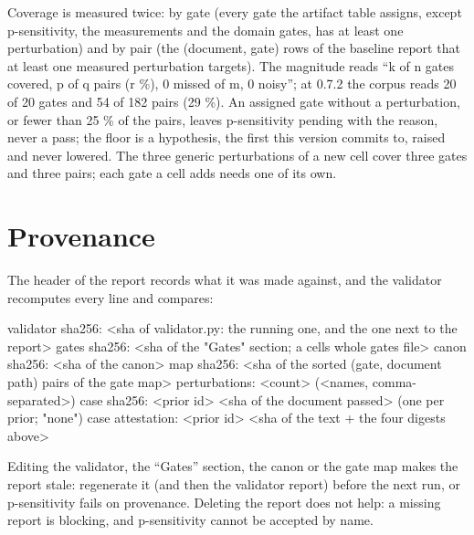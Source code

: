 \documentclass[
  american,
  10pt,
]{report}
\newenvironment{Shaded}{\begin{snugshade}}{\end{snugshade}}
\newcommand{\NormalTok}[1]{#1}
\newcounter{none} %
\renewenvironment{Shaded}{%
  \def\FrameCommand{{\color{rulecolor}\vrule width 2pt}\hspace{6pt}\colorbox{shadecolor}}%
  \MakeFramed{\advance\hsize-\width\FrameRestore}\small}%
  {\endMakeFramed}
\renewcommand{\texttt}[1]{{\ttfamily\hyphenchar\font=-1 #1}}
\begin{document}
Coverage is measured twice: by gate (every gate the artifact table
assigns, except \texttt{p-\allowbreak{}sensitivity}, the measurements
and the domain gates, has at least one perturbation) and by pair (the
(document, gate) rows of the baseline report that at least one measured
perturbation targets). The magnitude reads ``k of n gates covered, p of
q pairs (r \%), 0 missed of m, 0 noisy''; at 0.7.2 the corpus reads 20
of 20 gates and 54 of 182 pairs (29 \%). An assigned gate without a
perturbation, or fewer than 25 \% of the pairs, leaves
\texttt{p-\allowbreak{}sensitivity} pending with the reason, never a
pass; the floor is a hypothesis, the first this version commits to,
raised and never lowered. The three generic perturbations of a new cell
cover three gates and three pairs; each gate a cell adds needs one of
its own.

\section{Provenance}\label{provenance}

The header of the report records what it was made against, and the
validator recomputes every line and compares:

\begin{Shaded}
\begin{Highlighting}[]
\NormalTok{validator sha256: \textless{}sha of validator.py: the running one, and the one next to the report\textgreater{}}
\NormalTok{gates sha256: \textless{}sha of the "Gates" section; a cell\textquotesingle{}s whole gates file\textgreater{}}
\NormalTok{canon sha256: \textless{}sha of the canon\textgreater{}}
\NormalTok{map sha256: \textless{}sha of the sorted (gate, document path) pairs of the gate map\textgreater{}}
\NormalTok{perturbations: \textless{}count\textgreater{} (\textless{}names, comma{-}separated\textgreater{})}
\NormalTok{case sha256: \textless{}prior id\textgreater{} \textless{}sha of the document passed\textgreater{}   (one per prior; "none")}
\NormalTok{case attestation: \textless{}prior id\textgreater{} \textless{}sha of the text + the four digests above\textgreater{}}
\end{Highlighting}
\end{Shaded}

Editing the validator, the ``Gates'' section, the canon or the gate map
makes the report stale: regenerate it (and then the validator report)
before the next run, or \texttt{p-\allowbreak{}sensitivity} fails on
provenance. Deleting the report does not help: a missing report is
blocking, and \texttt{p-\allowbreak{}sensitivity} cannot be accepted by
name.
\end{document}
